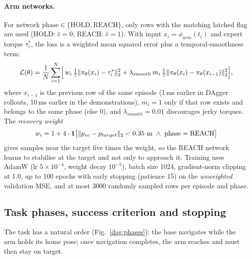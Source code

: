 \paragraph{Arm networks.} For network $\mathrm{phase}\in\{\text{HOLD},\text{REACH}\}$, only rows with the matching latched flag are used (HOLD: $\hat c=0$; REACH: $\hat c=1$). With input $x_i=\phi_{arm}(t_i)$ and expert torque $\tau_i^{*}$, the loss is a weighted mean squared error plus a temporal-smoothness term:
\begin{equation}
  \mathcal{L}(\theta)=\frac1N\sum_{i=1}^{N}\Bigl[\,w_i\,\tfrac{1}{7}\lVert \pi_\theta(x_i)-\tau_i^{*}\rVert_2^{2}
  +\lambda_{smooth}\,m_i\,\tfrac{1}{7}\lVert \pi_\theta(x_i)-\pi_\theta(x_{i-1})\rVert_2^{2}\Bigr],
  \label{dag:loss}
\end{equation}
where $x_{i-1}$ is the previous row of the same episode (1\,ms earlier in DAgger rollouts, 10\,ms earlier in the demonstrations), $m_i=1$ only if that row exists and belongs to the same phase (else $0$), and $\lambda_{smooth}=0.01$ discourages jerky torques. The \emph{recovery weight}
\begin{equation}
  w_i=1+4\cdot\dagone\bigl[\dagnorm{p_{ee}-p_{target}}<0.35\ \text{m}\ \wedge\ \text{phase}=\text{REACH}\bigr]
  \label{dag:weight}
\end{equation}
gives samples near the target five times the weight, so the REACH network learns to stabilise at the target and not only to approach it. Training uses AdamW (lr $5\times10^{-4}$, weight decay $10^{-5}$), batch size 1024, gradient-norm clipping at 1.0, up to 100 epochs with early stopping (patience 15) on the \emph{unweighted} validation MSE, and at most 3000 randomly sampled rows per episode and phase.

\subsection{Task phases, success criterion and stopping}
\label{dag:task}

The task has a natural order (Fig.~\ref{dag:phases}): the base navigates while the arm holds its home pose; once navigation completes, the arm reaches and must then stay on target.

